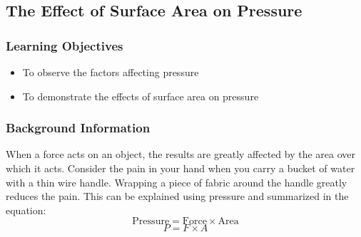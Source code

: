%
%


\subsection{The Effect of Surface Area on Pressure}

\subsubsection*{Learning Objectives}
\begin{itemize}
\item{To observe the factors affecting pressure} 
\item{To demonstrate the effects of surface area on pressure} 
\end{itemize}

\subsubsection*{Background Information}
When a force acts on an object, the results are greatly affected by the area over which it acts. Consider the pain in your hand when you carry a bucket of water with a thin wire handle. Wrapping a piece of fabric around the handle greatly reduces the pain. This can be explained using pressure and summarized in the equation:
$$\mathrm{Pressure} = \mathrm{Force} \times \mathrm{Area}$$
$$P=F\times A$$

